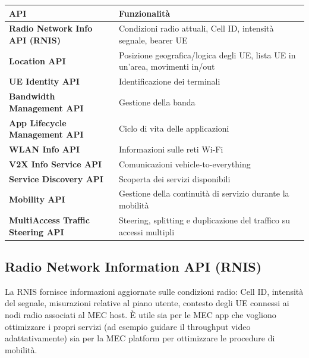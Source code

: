 \documentclass[
  italian,
  openany]{book}
\newcounter{none} %
\begin{document}
{\def\LTcaptype{none} %
\begin{longtable}[]{@{}
  >{\raggedright\arraybackslash}p{}
  >{\raggedright\arraybackslash}p{}@{}}
\toprule\noalign{}
\begin{minipage}[b]{\linewidth}\raggedright
API
\end{minipage} & \begin{minipage}[b]{\linewidth}\raggedright
Funzionalità
\end{minipage} \\
\midrule\noalign{}
\endhead
\bottomrule\noalign{}
\endlastfoot
\textbf{Radio Network Info API (RNIS)} & Condizioni radio attuali, Cell
ID, intensità segnale, bearer UE \\
\textbf{Location API} & Posizione geografica/logica degli UE, lista UE
in un'area, movimenti in/out \\
\textbf{UE Identity API} & Identificazione dei terminali \\
\textbf{Bandwidth Management API} & Gestione della banda \\
\textbf{App Lifecycle Management API} & Ciclo di vita delle
applicazioni \\
\textbf{WLAN Info API} & Informazioni sulle reti Wi-Fi \\
\textbf{V2X Info Service API} & Comunicazioni vehicle-to-everything \\
\textbf{Service Discovery API} & Scoperta dei servizi disponibili \\
\textbf{Mobility API} & Gestione della continuità di servizio durante la
mobilità \\
\textbf{MultiAccess Traffic Steering API} & Steering, splitting e
duplicazione del traffico su accessi multipli \\
\end{longtable}
}

\subsection{Radio Network Information API
(RNIS)}\label{radio-network-information-api-rnis}

La RNIS fornisce informazioni aggiornate sulle condizioni radio: Cell
ID, intensità del segnale, misurazioni relative al piano utente,
contesto degli UE connessi ai nodi radio associati al MEC host. È utile
sia per le MEC app che vogliono ottimizzare i propri servizi (ad esempio
guidare il throughput video adattativamente) sia per la MEC platform per
ottimizzare le procedure di mobilità.
\end{document}
